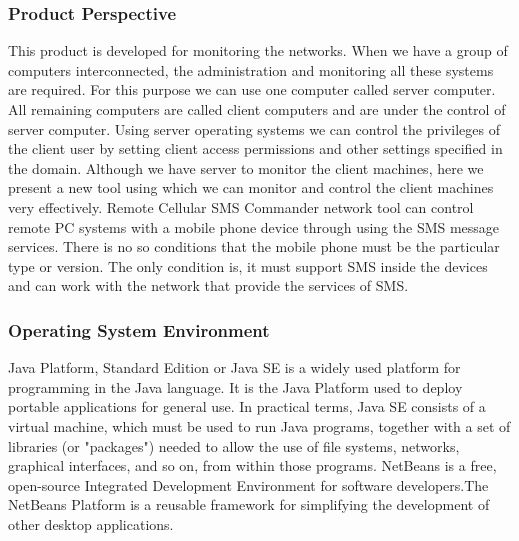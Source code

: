 \subsubsection{Product Perspective}
This product is developed for monitoring the networks. When we have a group of
computers interconnected, the administration and monitoring all these systems are required. For this purpose we can use one computer called server computer. All remaining
computers are called client computers and are under the control of server computer. Using server operating systems we can control the privileges of the client user by setting
client access permissions and other settings specified in the domain. Although we have
server to monitor the client machines, here we present a new tool using
which we can monitor and control the client machines very effectively. Remote Cellular
SMS Commander network tool can control remote PC systems with a mobile phone device through using the SMS message services. There is no so conditions that the mobile
phone must be the particular type or version. The only condition is, it must support
SMS inside the devices and can work with the network that provide the services of SMS.
\subsubsection{Operating System Environment}
Java Platform, Standard Edition or Java SE is a widely used platform for programming
in the Java language. It is the Java Platform used to deploy portable applications for
general use. In practical terms, Java SE consists of a virtual machine, which must be
used to run Java programs, together with a set of libraries (or "packages") needed to
allow the use of file systems, networks, graphical interfaces, and so on, from within those
programs. NetBeans is a free, open-source Integrated Development Environment for
software developers.The NetBeans Platform is a reusable framework for simplifying the
development of other desktop applications.
